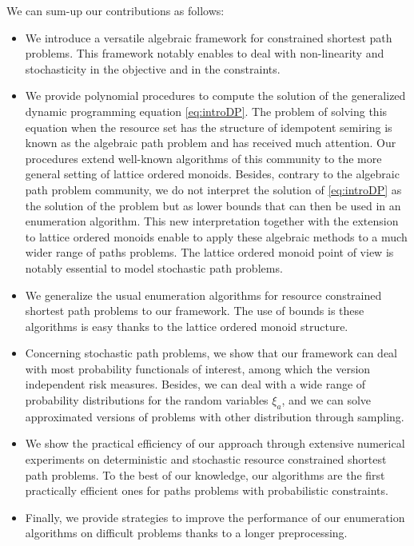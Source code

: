 \documentclass[11pt]{amsart}
\theoremstyle{plain}
\theoremstyle{remark}
\begin{document}
We can sum-up our contributions as follows:
\begin{itemize}
	\item We introduce a versatile algebraic framework for constrained shortest path problems. This framework notably enables to deal with non-linearity and stochasticity in the objective and in the constraints. 
	\item We provide polynomial procedures to compute the solution of the generalized dynamic programming equation \eqref{eq:introDP}. The problem of solving this equation when the resource set has the structure of idempotent semiring is known as the algebraic path problem and has received much attention. Our procedures extend well-known algorithms of this community to the more general setting of lattice ordered monoids. Besides, contrary to the algebraic path problem community, we do not interpret the solution of \eqref{eq:introDP} as the solution of the problem but as lower bounds that can then be used in an enumeration algorithm. This new interpretation together with the extension to lattice ordered monoids enable to apply these algebraic methods to a much wider range of paths problems. The lattice ordered monoid point of view is notably essential to model stochastic path problems.
\item We generalize the usual enumeration algorithms for resource constrained shortest path problems to our framework. The use of bounds is these algorithms is easy thanks to the lattice ordered monoid structure.  
	\item Concerning stochastic path problems, we show that our framework can deal with most probability functionals of interest, among which the version independent risk measures. Besides, we can deal with a wide range of probability distributions for the random variables $\xi_{a}$, and we can solve approximated versions of problems with other distribution through sampling.
	\item We show the practical efficiency of our approach through extensive numerical experiments on deterministic and stochastic resource constrained shortest path problems. To the best of our knowledge, our algorithms are the first practically efficient ones for paths problems with probabilistic constraints. 
	\item Finally, we provide strategies to improve the performance of our enumeration algorithms on difficult problems thanks to a longer preprocessing.
\end{itemize}
\end{document}
